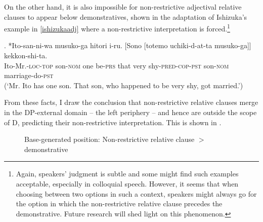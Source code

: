 On the other hand, it is also impossible for non-restrictive adjectival relative clauses to appear below demonstratives, shown in the adaptation of Ishizuka's example in \ref{ishizukaadj} where a non-restrictive interpretation is forced.\footnote{Again, speakers' judgment is subtle and some might find such examples acceptable, especially in colloquial speech. However, it seems that when choosing between two options in such a context, speakers might always go for the option in which the non-restrictive relative clause precedes the demonstrative. Future research will shed light on this phenomenon.}

\exg. *Ito-san-ni-wa musuko-ga hitori i-ru. [Sono [totemo uchiki-d-at-ta musuko-ga]] kekkon-shi-ta.\\
Ito-Mr.-\textsc{loc-top} son-\textsc{nom} one be-\textsc{prs} that very shy-\textsc{pred-cop-pst} son-\textsc{nom} marriage-do-\textsc{pst}\\
(`Mr. Ito has one son. That son, who happened to be very shy, got married.’) \label{ishizukaadj}

From these facts, I draw the conclusion that non-restrictive relative clauses merge in the DP-external domain -- the left periphery -- and hence are outside the scope of D, predicting their non-restrictive interpretation. This is shown in .

\begin{figure}
\centering
{}
\caption{Base-generated position: Non-restrictive relative clause $>$ demonstrative}
\label{non-restrictive rc - dem}
\end{figure}

